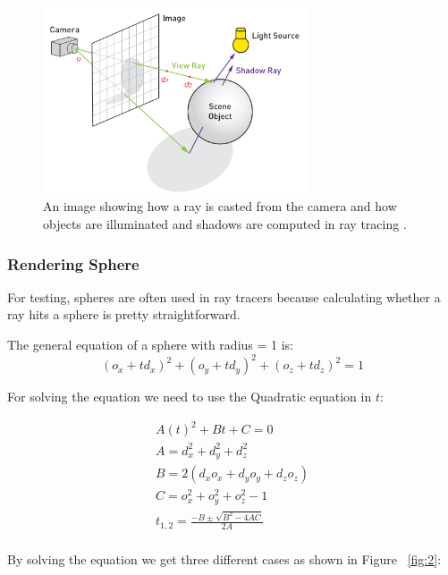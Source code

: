 \documentclass[11pt,a4paper]{article}
\begin{document}
			 \begin{figure}[H]	
			\begin{center}
				\includegraphics[width=0.7\textwidth]{6.png}
				
				\caption{ An image showing how a ray is casted from the camera and how objects are illuminated and shadows are computed in ray tracing	.} %
				\label{fig:1}
			\end{center}
		\end{figure}
	
	\subsubsection*{Rendering Sphere}
	For testing, spheres are often used in ray tracers because
	calculating whether a ray hits a sphere is pretty straightforward.
	
	The general equation of a sphere with radius = 1 is:
	\begin{equation}
		(o_x + td_x )^2 + (o_y + td_y )^2+ (o_z + td_z )^2= 1
	\end{equation}
	
	For solving the equation we need to use the Quadratic equation in $ t $: 
	
	\begin{equation}
		\begin{split}
			A(t)^2 + Bt+ C= 0 \\
			A = d^2_x + d^2_y + d^2_z \\	
			B = 2(d_xo_x + d_yo_y + d_zo_z) \\
			C = o^2_x + o^2_y + o^2_z - 1 \\
			t_{1,2} = \frac{-B \pm \sqrt{B^2 - 4AC}}{2A}\\
		\end{split}		
	\end{equation}
	
	
	By solving the equation we get three different cases as shown in Figure ~\ref{fig:2}:
	
\end{document}

